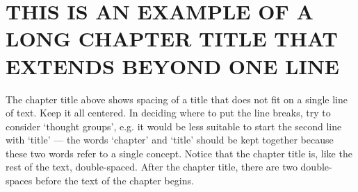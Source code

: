 \chapter{\MakeUppercase{THIS IS AN EXAMPLE OF A LONG CHAPTER TITLE THAT EXTENDS BEYOND ONE LINE}}

The chapter title above shows spacing of a title that does not fit on a single line of
text. Keep it all centered. In deciding where to put the line breaks, try to consider
`thought groups', e.g. it would be less suitable to start the second line with `title' —
the words `chapter' and `title' should be kept together because these two words
refer to a single concept.
Notice that the chapter title is, like the rest of the text, double-spaced. After the
chapter title, there are two double-spaces before the text of the chapter begins.


